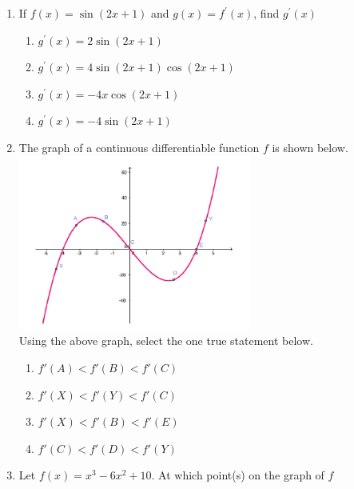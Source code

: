 \documentclass{article}
\begin{document}
\begin{enumerate}
\begin{minipage}[t]{\linewidth}
\begin{enumerate}
		\end{enumerate}
	\end{minipage}
	\item
	\begin{minipage}[t]{\linewidth}
		If \(f(x)=\sin \left(2x +1\right)\) and \(g(x) = f^{\prime}(x)\), find
\(g^{\prime}(x)\)\\[0.1em]
		\begin{enumerate}
		\itemsep1em
			\item  $g^{\prime}(x) = 2 \sin (2x + 1)$
			\item  $g^{\prime}(x) = 4 \sin(2x + 1) \cos(2x + 1)$
			\item  $g^{\prime}(x) = -4x \cos(2x + 1)$
			\item  $g^{\prime}(x) = -4 \sin (2x + 1)$
		\end{enumerate}
	\end{minipage}
	\item
	\begin{minipage}[t]{\linewidth}
		The graph of a continuous differentiable function \(f\) is shown
below.\\
\includegraphics[width=0.6\textwidth,height=\textheight]{graph1.PNG}\\
Using the above graph, select the one true statement below.\\[0.1em]
		\begin{enumerate}
		\itemsep1em
			\item  $f'(A) < f'(B) < f'(C)$
			\item  $f'(X) < f'(Y) < f'(C)$
			\item  $f'(X) < f'(B) < f'(E)$
			\item  $f'(C) < f'(D) < f'(Y)$
		\end{enumerate}
	\end{minipage}
	\item
	\begin{minipage}[t]{\linewidth}
		Let \(f(x)=x^{3}-6 x^{2}+10\). At which point(s) on the graph of \(f\)

\end{minipage}
\end{enumerate}
\end{document}
